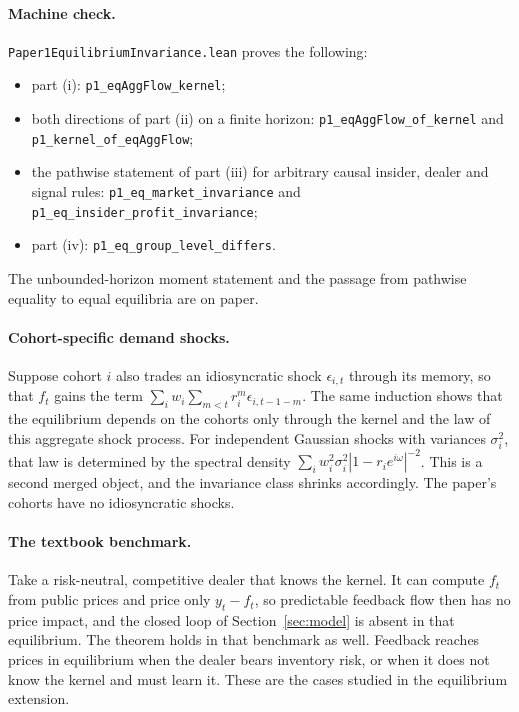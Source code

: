 \paragraph{Machine check.} \nolinkurl{Paper1EquilibriumInvariance.lean} proves the following:
\begin{itemize}[itemsep=1pt,topsep=2pt]
\item part (i): \texttt{p1\_eqAggFlow\_kernel};
\item both directions of part (ii) on a finite horizon: \texttt{p1\_eqAggFlow\_of\_kernel} and \texttt{p1\_kernel\_of\_eqAggFlow};
\item the pathwise statement of part (iii) for arbitrary causal insider, dealer and signal rules: \texttt{p1\_eq\_market\_invariance} and \texttt{p1\_eq\_insider\_profit\_invariance};
\item part (iv): \texttt{p1\_eq\_group\_level\_differs}.
\end{itemize}
The unbounded-horizon moment statement and the passage from pathwise equality to equal equilibria are on paper.

\paragraph{Cohort-specific demand shocks.} Suppose cohort $i$ also trades an idiosyncratic shock $\epsilon_{i,t}$ through its memory, so that $f_t$ gains the term $\sum_iw_i\sum_{m<t}r_i^m\epsilon_{i,t-1-m}$. The same induction shows that the equilibrium depends on the cohorts only through the kernel and the law of this aggregate shock process. For independent Gaussian shocks with variances $\sigma_i^2$, that law is determined by the spectral density $\sum_iw_i^2\sigma_i^2|1-r_ie^{i\omega}|^{-2}$. This is a second merged object, and the invariance class shrinks accordingly. The paper's cohorts have no idiosyncratic shocks.

\paragraph{The textbook benchmark.} Take a risk-neutral, competitive dealer that knows the kernel. It can compute $f_t$ from public prices and price only $y_t-f_t$, so predictable feedback flow then has no price impact, and the closed loop of Section~\ref{sec:model} is absent in that equilibrium. The theorem holds in that benchmark as well. Feedback reaches prices in equilibrium when the dealer bears inventory risk, or when it does not know the kernel and must learn it. These are the cases studied in the equilibrium extension.

